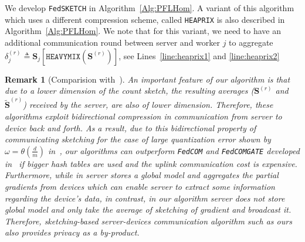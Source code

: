 \documentclass[twoside]{article}
\newtheorem{remark}{Remark}
\begin{document}
We develop \texttt{FedSKETCH} in Algorithm~\ref{Alg:PFLHom}. 
A variant of this algorithm which uses a different compression scheme, called \texttt{HEAPRIX} is also described in Algorithm~\ref{Alg:PFLHom}. 
We note that for this variant, we need to have an additional communication round between server and worker $j$ to aggregate $\delta_j^{(r)}\triangleq \mathbf{S}_j\left[\texttt{HEAVYMIX}(\mathbf{S}^{(r)})\right]$, see Lines~\ref{line:heaprix1} and \ref{line:heaprix2}

\begin{remark}[Comparision  with~\cite{haddadpour2020federated}]\label{rmrk:bidirect}
An important feature of our algorithm is that due to a lower dimension of the count sketch, the resulting averages ($\mathbf{S}^{(r)}$ and  $\tilde{\mathbf{S}}^{(r)}$) received by the server, are also of lower dimension. 
Therefore, these algorithms exploit bidirectional compression in communication from server to device back and forth. 
As a result, due to this bidirectional property of communicating sketching for the case of large quantization error shown by $\omega=\theta(\frac{d}{m})$ in~\cite{haddadpour2020federated}, our algorithms can outperform \texttt{FedCOM} and \texttt{FedCOMGATE} developed in~\cite{haddadpour2020federated} if bigger hash tables are used and the uplink communication cost is expensive. 
Furthermore, while in \cite{haddadpour2019convergence} server stores a global model and aggregates the partial gradients from devices which can enable server to extract some information regarding the device's data, in contrast, in our algorithm server does not store global model and only take the average of sketching of gradient and broadcast it. Therefore, sketching-based server-devices communication algorithm such as ours also provides privacy as a by-product.
\end{remark}
\end{document}
